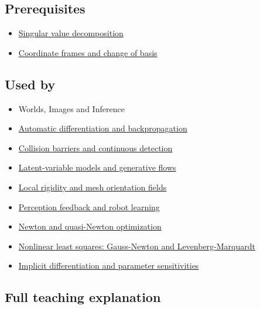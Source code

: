 \subsection{Prerequisites}\label{appendix-29f4bea4c2bb-prerequisites}

\begin{itemize}
\tightlist
\item
  \hyperref[appendix-1fad5e7f36fa]{Singular value decomposition}
\item
  \hyperref[appendix-1bae9457dbc3]{Coordinate frames and change of basis}
\end{itemize}

\subsection{Used by}\label{appendix-29f4bea4c2bb-used-by}

\begin{itemize}
\item
  {Worlds, Images and Inference}
\item
  \hyperref[appendix-40df0855b4a7]{Automatic differentiation and backpropagation}
\item
  \hyperref[appendix-a9ba01fa72a6]{Collision barriers and continuous detection}
\item
  \hyperref[appendix-2c568f05ee34]{Latent-variable models and generative flows}
\item
  \hyperref[appendix-7107009c505b]{Local rigidity and mesh orientation fields}
\item
  \hyperref[appendix-b0c42da325f1]{Perception feedback and robot learning}
\item
  \hyperref[appendix-54c8f5828387]{Newton and quasi-Newton optimization}
\item
  \hyperref[appendix-2c2df8345991]{Nonlinear least squares: Gauss-Newton and Levenberg-Marquardt}
\item
  \hyperref[appendix-8836553d56fc]{Implicit differentiation and parameter sensitivities}
\end{itemize}

\subsection{Full teaching explanation}\label{appendix-29f4bea4c2bb-full-teaching-explanation}

